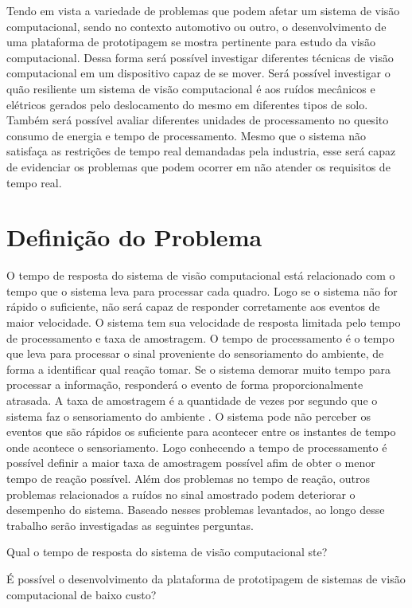 Tendo em vista a variedade de problemas que podem afetar um sistema de visão computacional, sendo no contexto automotivo ou outro, o desenvolvimento de uma plataforma de prototipagem se mostra pertinente para estudo da visão computacional. Dessa forma será possível investigar diferentes técnicas de visão computacional em um dispositivo capaz de se mover. Será possível investigar o quão resiliente um sistema de visão computacional é aos ruídos mecânicos e elétricos gerados pelo deslocamento do mesmo em diferentes tipos de solo. Também será possível avaliar diferentes unidades de processamento no quesito consumo de energia e tempo de processamento. Mesmo que o sistema não satisfaça as restrições de tempo real demandadas pela industria, esse será capaz de evidenciar os problemas que podem ocorrer em não atender os requisitos de tempo real.

\pagebreak

\section{Definição do Problema}

O tempo de resposta do sistema de visão computacional está relacionado com o tempo que o sistema leva para processar cada quadro. Logo se o sistema não for rápido o suficiente, não será capaz de responder corretamente aos eventos de maior velocidade. 
O sistema tem sua velocidade de resposta limitada pelo tempo de processamento e taxa de amostragem. 
O tempo de processamento é o tempo que leva para processar o sinal proveniente do sensoriamento do ambiente, de forma a identificar qual reação tomar.
Se o sistema demorar muito tempo para processar a informação, responderá o evento de forma proporcionalmente atrasada.
A taxa de amostragem é a quantidade de vezes por segundo que o sistema faz o sensoriamento do ambiente \cite{lathi2014}. 
O sistema pode não perceber os eventos que são rápidos os suficiente para acontecer entre os instantes de tempo onde acontece o sensoriamento. 
Logo conhecendo a tempo de processamento é possível definir a maior taxa de amostragem possível afim de obter o menor tempo de reação possível.
Além dos problemas no tempo de reação, outros problemas relacionados a ruídos no sinal amostrado podem deteriorar o desempenho do sistema. 
Baseado nesses problemas levantados, ao longo desse trabalho serão investigadas as seguintes perguntas.

\begin{alineas}
    \item Qual o tempo de resposta do sistema de visão computacional ste?
    \item É possível o desenvolvimento da plataforma de prototipagem de sistemas de visão computacional de baixo custo?
\end{alineas}

